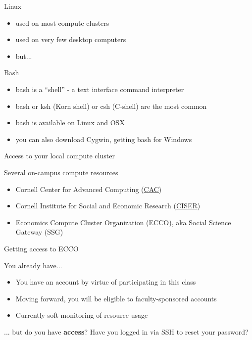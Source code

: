\documentclass[xcolor=table,compress]{beamer}
\begin{document}
\begin{frame}
\begin{block}{Linux}
\begin{itemize}
\item used on most compute clusters
\item used on very few desktop computers
\item but...
\end{itemize}
\end{block}
\pause
\begin{block}{Bash}
\begin{itemize}
\item bash is a ``shell'' - a text interface command interpreter
\item bash or ksh (Korn shell) or csh (C-shell) are the most common
\item bash is available on Linux and \pause OSX
\item you can also download Cygwin, getting bash for Windows
\end{itemize}
\end{block}
\end{frame}

\begin{frame}{Access to your local compute cluster}
\begin{block}{Several on-campus compute resources}
\begin{itemize}[<+->]
\item Cornell Center for Advanced Computing (\href{http://www.cac.cornell.edu}{CAC})\newline {}
\item Cornell Institute for Social and Economic Research (\href{http://www.ciser.cornell.edu}{CISER})
\pause
\item Economics Compute Cluster Organization (ECCO), aka Social Science Gateway (SSG)
\end{itemize}
\end{block}
\end{frame}


\begin{frame}{Getting access to ECCO}
\begin{block}{You already have...}
\begin{itemize}
\item You have an account by virtue of participating in this class
\item Moving forward, you will be eligible to faculty-sponsored accounts
\item Currently soft-monitoring of resource usage
\end{itemize}
\end{block}
\pause
\begin{block}{... but do you have \textbf{access}?}
Have you logged in via SSH to reset your password? \newline {}
\end{block}
\end{frame}
\end{document}
